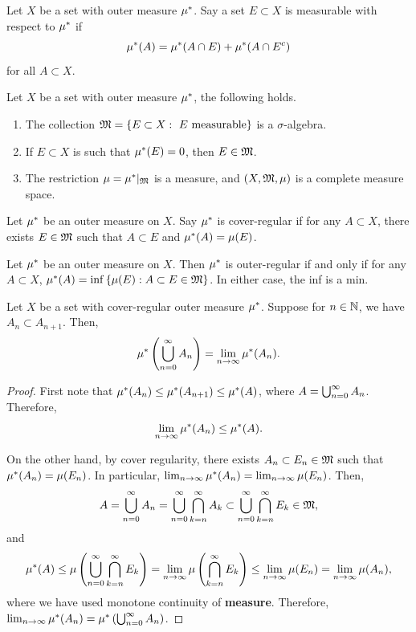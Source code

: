 \documentclass[a4paper]{article}
\begin{document}
\begin{defi}
  Let $X$ be a set with outer measure $\mu^*$. Say
  a set $E \subset X$ is measurable with respect to
  $\mu^*$ if
  \[
  \mu^*(A) = \mu^*(A \cap E) + \mu^*(A \cap E^c)
  \]
  for all $A \subset X$.
\end{defi}

\begin{thm}
  Let $X$ be a set with outer measure $\mu^*$, the following
  holds.
  \begin{enumerate}
    \item The collection $\mathfrak{M} = \left\{ E \subset X: \text{
      $E$ measurable} \right\}$
      is a $\sigma$-algebra.
    \item If $E \subset X$ is such that $\mu^*(E) = 0$, then
    $E \in \mathfrak{M}$.
    \item The restriction $\mu = \mu^* \vert_{\mathfrak{M}}$ is a measure,
    and $(X, \mathfrak{M}, \mu)$ is a complete measure space.
  \end{enumerate}
\end{thm}

\begin{defi}
  Let $\mu^*$ be an outer measure on $X$. Say $\mu^*$
  is cover-regular if for any $A \subset X$, there
  exists $E \in \mathfrak{M}$ such that $A \subset E$
  and $\mu^*(A) = \mu(E)$.
\end{defi}

\begin{prop}
  Let $\mu^*$ be an outer measure on $X$. Then $\mu^*$
  is outer-regular if and only if for any $A \subset X$,
  $\mu^*(A) = \inf \left\{ \mu(E) : A \subset E \in
  \mathfrak{M} \right\}$. In either case, the inf is a min.
\end{prop}

\begin{prop}
  Let $X$ be a set with cover-regular outer measure
  $\mu^*$. Suppose for $n \in \mathbb{N}$, we have $A_n \subset
  A_{n+1}$. Then,
  \[
  \mu^* \left( \bigcup_{n=0}^\infty A_n \right)
  = \lim_{n \to \infty} \mu^*(A_n).
  \]
\end{prop}

\begin{proof}
  First note that $\mu^*(A_n) \leq \mu^*(A_{n+1})
  \leq \mu^*(A)$, where $A = \bigcup_{n=0}^\infty A_n$.
  Therefore,
  \[
    \lim_{n \to \infty} \mu^*(A_n) \leq \mu^*(A).
  \]

  On the other hand, by cover regularity, there exists
  $A_n \subset E_n \in \mathfrak{M}$ such that $\mu^*(A_n) = \mu(E_n)$.
  In particular, $\lim_{n \to \infty} \mu^* (A_n)
  = \lim_{n \to \infty} \mu(E_n)$. Then,
  \[
  A = \bigcup_{n=0}^\infty A_n = \bigcup_{n=0}^\infty \bigcap_{k=n}^\infty A_k
  \subset \bigcup_{n=0}^\infty \bigcap_{k=n}^\infty E_k \in \mathfrak{M},
  \]
  and
  \[
  \begin{aligned}
    \mu^*(A)
    \leq \mu \left( \bigcup_{n=0}^\infty
    \bigcap_{k=n}^\infty E_k \right)
    = \lim_{n \to \infty} \mu \left( \bigcap_{k=n}^\infty
    E_k \right)
    \leq \lim_{n \to \infty} \mu (E_n)
    = \lim_{n \to \infty} \mu(A_n),
  \end{aligned}
  \]
  where we have used monotone continuity of \textbf{measure}.
  Therefore, $\lim_{n \to \infty} \mu^* (A_n) = \mu^*
  \left( \bigcup_{n=0}^\infty A_n \right)$.
\end{proof}
\end{document}
